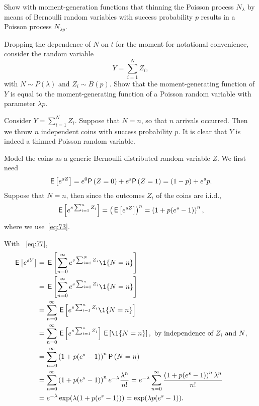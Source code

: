\begin{exercise}
 Show with moment-generation functions that thinning the Poisson process $N_\lambda$ by means of Bernoulli random variables with success probability $p$ results in a Poisson process $N_{\lambda p}$.
\begin{hint}
Dropping the dependence of $N$ on $t$ for the moment for notational convenience, consider the random variable 
 \begin{equation*}
 Y = \sum_{i=1}^N Z_i,
 \end{equation*}
 with $N\sim P(\lambda)$ and $Z_i\sim B(p)$. Show that the moment-generating function of $Y$ is equal to the moment-generating
 function of a Poisson random variable with parameter $\lambda p$.
\end{hint}
\begin{solution}
Consider $Y=\sum_{i=1}^N Z_i$. Suppose that $N=n$, so that $n$
arrivals occurred. Then we throw $n$ independent coins with success probability
$p$. It is clear that $Y$ is indeed a thinned Poisson random variable.

Model the coins as a generic Bernoulli distributed random variable
$Z$. We first need
\begin{equation*}
 \E{e^{s Z}} = e^0 \P{Z=0} + e^{s} \P{Z=1} = (1-p) + e^s p.
\end{equation*}
Suppose that $N=n$, then since the outcomes $Z_i$ of the coins are i.i.d.,
\begin{equation*}
\,\mathsf{E}\left[e^{s\sum_{i=1}^n Z_i}\right] = \left(\,\mathsf{E}\left[e^{s Z}\right]\right)^n = \left(1 + p (e^s - 1)\right)^n,
\end{equation*}
where we use~\cref{eq:73}. 

With ~\cref{eq:77}, 
\begin{align*}
 \E{e^{s Y}}
&= \E{\sum_{n=0}^\infty e^{s\sum_{i=1}^N Z_i} \1{N=n}} \\
&= \E{\sum_{n=0}^\infty e^{s\sum_{i=1}^n Z_i} \1{N=n}} \\
&= \sum_{n=0}^\infty \E{e^{s\sum_{i=1}^n Z_i} \1{N=n}} \\
&= \sum_{n=0}^\infty \E{e^{s\sum_{i=1}^n Z_i}} \E{\1{N=n}}, \text{ by independence of $Z_i$ and $N$}, \\
&= \sum_{n=0}^\infty \left(1+p(e^s-1)\right)^n \P{N=n} \\
&= \sum_{n=0}^\infty \left(1+p(e^s-1)\right)^n e^{-\lambda} \frac{\lambda^n}{n!}
= e^{-\lambda} \sum_{n=0}^\infty \frac{\left(1+p(e^s-1)\right)^n \lambda^n}{n!}\\
&= e^{-\lambda} \exp(\lambda (1+p(e^s-1))) = \exp(\lambda p (e^s - 1)).
\end{align*}
\end{solution}
\end{exercise} 

